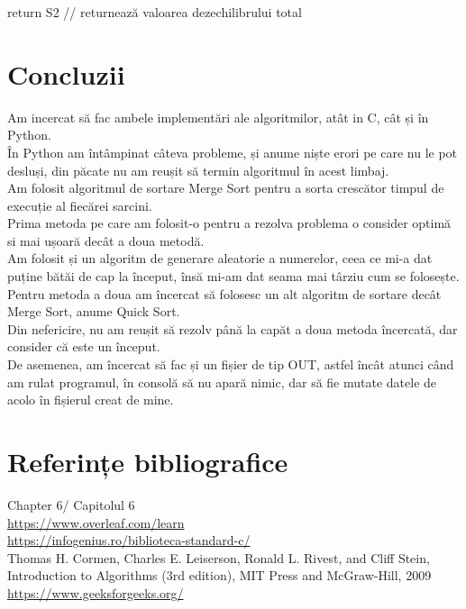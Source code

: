 \documentclass{article}
\begin{document}
return S2 \hspace{1cm} // returnează valoarea dezechilibrului total 
 \newpage 
\section{Concluzii}
 Am incercat să fac ambele implementări ale algoritmilor, atât in C, cât și în Python. \\
 În Python am întâmpinat câteva probleme, și anume niște erori pe care nu le pot desluși, din păcate nu am reușit să termin algoritmul în acest limbaj. \\
 Am folosit algoritmul de sortare Merge Sort pentru a sorta crescător timpul de execuție al fiecărei sarcini. \\
 Prima metoda pe care am folosit-o pentru a rezolva problema o consider optimă si mai ușoară decât a doua metodă. \\
 Am folosit și un algoritm de generare aleatorie a numerelor, ceea ce mi-a dat puține bătăi de cap la început, însă mi-am dat seama mai târziu cum se folosește. \\
 Pentru metoda a doua am încercat să folosesc un alt algoritm de sortare decât Merge Sort, anume Quick Sort. \\
 Din nefericire, nu am reușit să rezolv până la capăt a doua metoda încercată, dar consider că este un început. \\
  De asemenea, am încercat să fac și un fișier de tip OUT, astfel încât atunci când am rulat programul, în consolă să nu apară nimic, dar să fie mutate datele de acolo în fișierul creat de mine. \\
 \newpage 
 
\section{Referințe bibliografice}

  \hspace{0.4cm} Chapter 6/ Capitolul 6 \\
  \hspace{0.4cm} \url{https://www.overleaf.com/learn} \\
  \hspace{0.4cm} \url{https://infogenius.ro/biblioteca-standard-c/} \\
  \hspace{0.4cm} Thomas H. Cormen, Charles E. Leiserson, Ronald L. Rivest, and Cliﬀ Stein, Introduction to Algorithms (3rd edition), MIT Press and McGraw-Hill, 2009 \\
  \hspace{0.4cm} \url{https://www.geeksforgeeks.org/}
 
\end{document}
